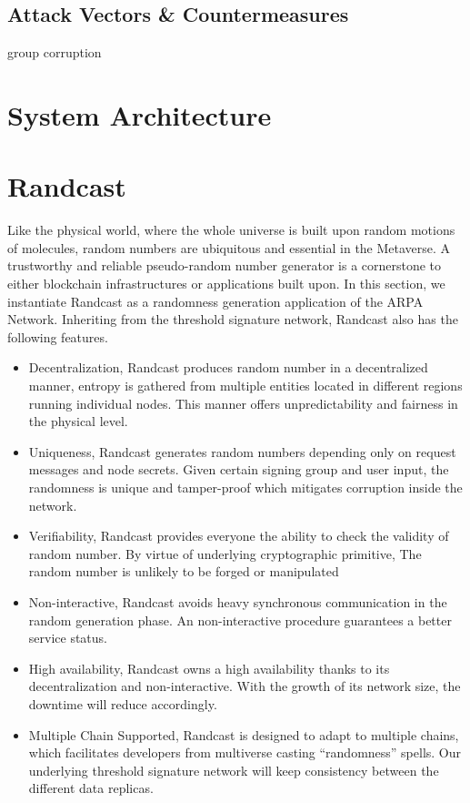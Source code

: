 \documentclass[11pt]{article}
\begin{document}
\subsection{Attack Vectors \& Countermeasures}

group corruption


\section{System Architecture}


\section{Randcast}

Like the physical world, where the whole universe is built upon random motions of molecules, random numbers are ubiquitous and essential in the Metaverse. A trustworthy and reliable pseudo-random number generator is a cornerstone to either blockchain infrastructures or applications built upon. In this section, we instantiate Randcast as a randomness generation application of the ARPA Network. Inheriting from the threshold signature network, Randcast also has the following features.

\begin{itemize}
    \item Decentralization, Randcast produces random number in a decentralized manner, entropy is gathered from multiple entities located in different regions running individual nodes. This manner offers unpredictability and fairness in the physical level.
    \item Uniqueness, Randcast generates random numbers depending only on request messages and node secrets. Given certain signing group and user input, the randomness is unique and tamper-proof which mitigates corruption inside the network.
    \item Verifiability, Randcast provides everyone the ability to check the validity of random number. By virtue of underlying cryptographic primitive, The random number is unlikely to be forged or manipulated
    \item Non-interactive, Randcast avoids heavy synchronous communication in the random generation phase. An non-interactive procedure guarantees a better service status.
    \item High availability, Randcast owns a high availability thanks to its decentralization and non-interactive. With the growth of its network size, the downtime will reduce accordingly.
    \item Multiple Chain Supported, Randcast is designed to adapt to multiple chains, which facilitates developers from multiverse casting “randomness” spells. Our underlying threshold signature network will keep consistency between the different data replicas.
\end{itemize}
\end{document}
